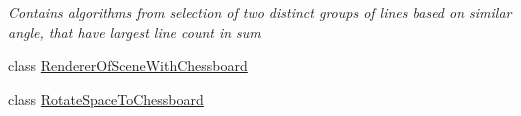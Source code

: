 \begin{DoxyCompactItemize}
\begin{DoxyCompactList}\small\item\em Contains algorithms from selection of two distinct groups of lines based on similar angle, that have largest line count in sum \end{DoxyCompactList}\item 
class \mbox{\hyperlink{class_chess_tracking_1_1_image_processing_1_1_chessboard_algorithms_1_1_renderer_of_scene_with_chessboard}{Renderer\+Of\+Scene\+With\+Chessboard}}
\item 
class \mbox{\hyperlink{class_chess_tracking_1_1_image_processing_1_1_chessboard_algorithms_1_1_rotate_space_to_chessboard}{Rotate\+Space\+To\+Chessboard}}
\end{DoxyCompactItemize}
